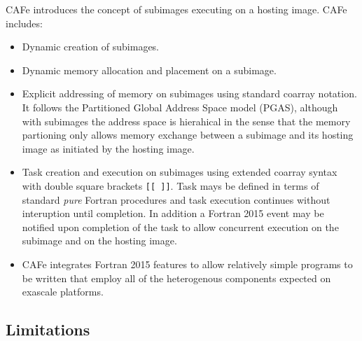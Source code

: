 CAFe introduces the concept of subimages executing on a hosting image.  CAFe includes:
\begin{itemize}
\item
  Dynamic creation of subimages.
\item
  Dynamic memory allocation and placement on a subimage.
\item
  Explicit addressing of memory on subimages using standard coarray notation.  It follows
  the Partitioned Global Address Space model (PGAS), although with subimages the address
  space is hierahical in the sense that the memory partioning only allows memory exchange
  between a subimage and its hosting image as initiated by the hosting image.
\item
  Task creation and execution on subimages using extended coarray syntax with double
  square brackets \texttt{[[ ]]}.  Task mays be defined in terms of standard \emph{pure}
  Fortran procedures and task execution continues without interuption until completion.
  In addition a Fortran 2015 event may be notified upon completion of the task to allow
  concurrent execution on the subimage and on the hosting image.
\item
  CAFe integrates Fortran 2015 features to allow relatively simple programs to be written
  that employ all of the heterogenous components expected on exascale platforms.
\end{itemize}

\subsection{Limitations}

